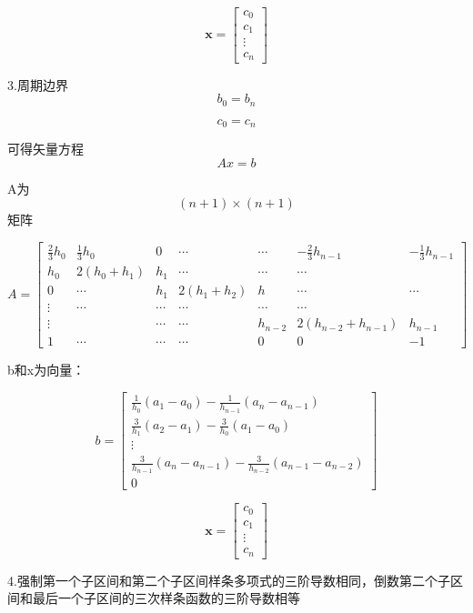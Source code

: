 \documentclass[UTF8]{ctexart}
\begin{document}
$$
\boldsymbol{x}=\left[\begin{array}{c}{c_{0}} \\ {c_{1}} \\ {\vdots} \\ {c_{n}}\end{array}\right]
$$




 3.周期边界
$$b_0=b_n
$$

$$
c_0=c_n
$$

可得矢量方程$$ Ax=b$$


A为$$ (n+1)\times (n+1)$$矩阵


$$
A=\left[\begin{array}{lllllll}
{\frac{2}{3}h_0} & {\frac{1}{3}h_0} & {0} & {\cdots} & {\cdots} & {-\frac{2}{3}h_{n-1}} & {-\frac{1}{3}h_{n-1}} \\ 
{h_{0}} & {2\left(h_{0}+h_{1}\right)} & {h_{1}} & {\cdots} & {\cdots} & {\cdots} \\ 
{0} & {\cdots} & {h_{1} } & {2\left(h_{1}+h_{2}\right)} & {h} & {\cdots} & {\cdots} \\ 
{\vdots} & {\cdots} & {\cdots} & {\cdots} & {\cdots} & {\cdots} \\ 
{\vdots} & {} & {\cdots} & {\cdots} & {h_{n-2}} & { 2(h_{n-2}+h_{n-1})} & {h_{n-1}} \\ 
{1} & {\cdots} & {\cdots} & {\cdots}  & {0} & {0} & {-1}
\end{array}\right]
$$

b和x为向量：


$$
b=\left[\begin{array}{c}{ \frac{1}{h_0}(a_1-a_0) - \frac{1}{h_{n-1}}(a_{n}-a_{n-1})} \\ {\frac{3}{h_{1}}\left(a_{2}-a_{1}\right)-\frac{3}{h_{0}}\left(a_{1}-a_{0}\right)} \\ {\vdots} \\ {\frac{3}{h_{n-1}}\left(a_{n}-a_{n-1}\right)-\frac{3}{h_{n-2}}\left(a_{n-1}-a_{n-2}\right)} \\ {0}\end{array}\right]
$$


$$
\boldsymbol{x}=\left[\begin{array}{c}{c_{0}} \\ {c_{1}} \\ {\vdots} \\ {c_{n}}\end{array}\right]
$$


4.强制第一个子区间和第二个子区间样条多项式的三阶导数相同，倒数第二个子区间和最后一个子区间的三次样条函数的三阶导数相等
\end{document}
